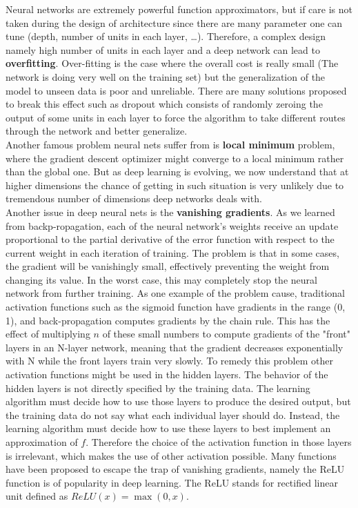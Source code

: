 Neural networks are extremely powerful function approximators, but if care is not taken during the design of architecture since there are many parameter one can tune (depth, number of units in each layer, \ldots). Therefore, a complex design namely high number of units in each layer and a deep network can lead to \textbf{overfitting}. Over-fitting is the case where the overall cost is really small (The network is doing very well on the training set) but the generalization of the model to unseen data is poor and unreliable. There are many solutions proposed to break this effect such as dropout which consists of randomly zeroing the output of some units in each layer to force the algorithm to take different routes through the network and better generalize. \\
Another famous problem neural nets suffer from is \textbf{local minimum} problem, where the gradient descent optimizer might converge to a local minimum rather than the global one. But as deep learning is evolving, we now understand that at higher dimensions the chance of getting in such situation is very unlikely due to tremendous number of dimensions deep networks deals with. \\
Another issue in deep neural nets is the \textbf{vanishing gradients}. As we learned from backp-ropagation, each of the neural network's weights receive an update proportional to the partial derivative of the error function with respect to the current weight in each iteration of training. The problem is that in some cases, the gradient will be vanishingly small, effectively preventing the weight from changing its value. In the worst case, this may completely stop the neural network from further training. As one example of the problem cause, traditional activation functions such as the sigmoid function have gradients in the range (0, 1), and back-propagation computes gradients by the chain rule. This has the effect of multiplying $n$ of these small numbers to compute gradients of the "front" layers in an N-layer network, meaning that the gradient decreases exponentially with N while the front layers train very slowly.
To remedy this problem other activation functions might be used in the hidden layers. The behavior of the hidden layers is not directly
specified by the training data. The learning algorithm must decide how to use those layers to produce the desired output, but the training data do not say what each individual layer should do. Instead, the learning algorithm must decide how to use these layers to best implement an approximation of $f$. Therefore the choice of the activation function in those layers is irrelevant, which makes the use of other activation possible. Many functions have been proposed to escape the trap of vanishing gradients, namely the ReLU function is of popularity in deep learning. The ReLU stands for rectified linear unit defined as $ReLU(x) = \max (0, x)$.

